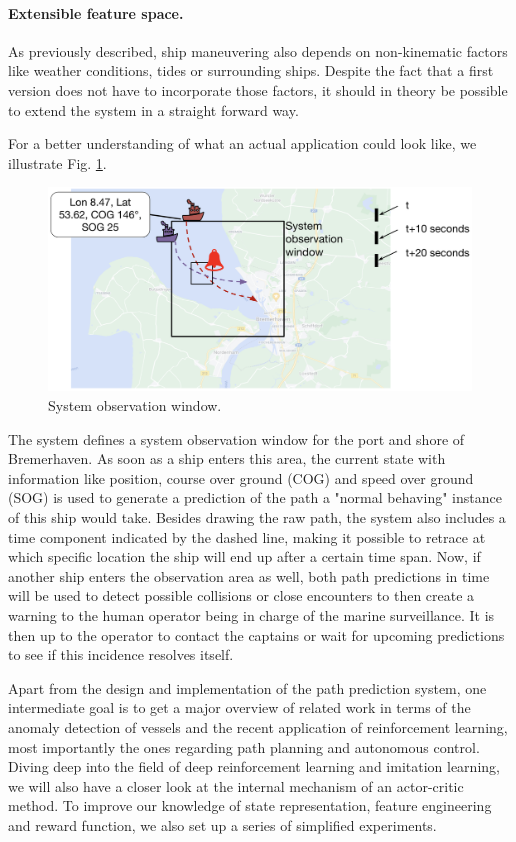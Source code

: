 \paragraph{Extensible feature space.}
As previously described, ship maneuvering also depends on non-kinematic factors like weather conditions, tides or surrounding ships. Despite the fact that a first version does not have to incorporate those factors, it should in theory be possible to extend the system in a straight forward way.


For a better understanding of what an actual application could look like, we illustrate Fig. \ref{fig:systemObservation}.
\begin{figure}[H]
    \centering
    \includegraphics[width=\textwidth]{images/system_observation.png}
    \caption{System observation window.}
    \label{fig:systemObservation}
\end{figure}

The system defines a system observation window for the port and shore of Bremerhaven. As soon as a ship enters this area, the current state with information like position, course over ground (COG) and speed over ground (SOG) is used to generate a prediction of the path a "normal behaving" instance of this ship would take. Besides drawing the raw path, the system also includes a time component indicated by the dashed line, making it possible to retrace at which specific location the ship will end up after a certain time span. Now, if another ship enters the observation area as well, both path predictions in time will be used to detect possible collisions or close encounters to then create a warning to the human operator being in charge of the marine surveillance. It is then up to the operator to contact the captains or wait for upcoming predictions to see if this incidence resolves itself.
\par
Apart from the design and implementation of the path prediction system, one intermediate goal is to get a major overview of related work in terms of the anomaly detection of vessels and the recent application of reinforcement learning, most importantly the ones regarding path planning and autonomous control. Diving deep into the field of deep reinforcement learning and imitation learning, we will also have a closer look at the internal mechanism of an actor-critic method. To improve our knowledge of state representation, feature engineering and reward function, we also set up a series of simplified experiments.